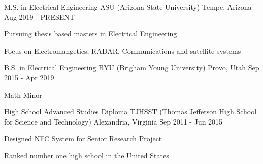 

\begin{cventries}

    \cventry
    {M.S. in Electrical Engineering} %
    {ASU (Arizona State University)} %
    {Tempe, Arizona} %
    {Aug 2019 - PRESENT} %
    {
        \begin{cvitems} %
        \item {Pursuing thesis based masters in Electrical Engineering}
        \item {Focus on Electromangetics, RADAR, Communications and satellite systems}
        \end{cvitems}
    }

    \cventry
    {B.S. in Electrical Engineering} %
    {BYU (Brigham Young University)} %
    {Provo, Utah} %
    {Sep 2015 - Apr 2019} %
    {
        \begin{cvitems} %
        \item {Math Minor}
        \end{cvitems}
    }

    \cventry
    {High School Advanced Studies Diploma} %
    {TJHSST (Thomas Jefferson High School for Science and Technology)} %
    {Alexandria, Virginia} %
    {Sep 2011 - Jun 2015} %
    {
        \begin{cvitems} %
        \item {Designed NFC System for Senior Research Project}
        \item {Ranked number one high school in the United States} 
        \end{cvitems}
    }

\end{cventries}
